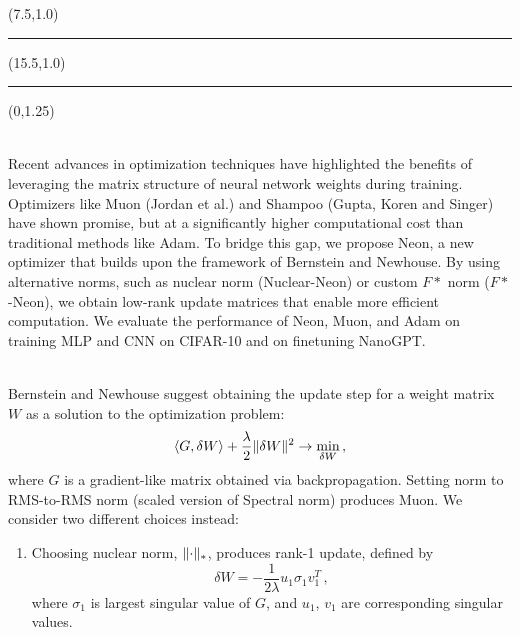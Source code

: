 \documentclass[a0]{a0poster}
\def\Head#1{\noindent{\LARGE\color{black} #1}\bigskip}
\begin{document}
\begin{textblock}{0.02}(7.5,1.0)
\textcolor{lightgray}{\rule{0.02\TPHorizModule}{10\TPVertModule}}
\end{textblock}

\begin{textblock}{0.02}(15.5,1.0)
\textcolor{lightgray}{\rule{0.02\TPHorizModule}{10\TPVertModule}}
\end{textblock}

\begin{textblock}{7.0}(0,1.25)

\Head{Introduction}\\
Recent advances in optimization techniques have highlighted the benefits of leveraging the matrix structure of neural network weights during training. Optimizers like Muon (Jordan et al.) and Shampoo (Gupta, Koren and Singer) have shown promise, but at a significantly higher computational cost than traditional methods like Adam. To bridge this gap, we propose Neon, a new optimizer that builds upon the framework of Bernstein and Newhouse. By using alternative norms, such as nuclear norm (Nuclear-Neon) or custom $F*$ norm ($F*$-Neon), we obtain low-rank update matrices that enable more efficient computation. We evaluate the performance of Neon, Muon, and Adam on training MLP and CNN on CIFAR-10 and on finetuning NanoGPT.

\medskip
\Head{Neon's update rule}\\
Bernstein and Newhouse suggest obtaining the update step for a weight matrix $W$ as a solution to the optimization problem:
\begin{equation}
    \langle G, \delta W \rangle + \frac{\lambda}{2} \Vert{\delta W}\Vert^2 \to \min_{\delta W}\,,
\end{equation}
where $G$ is a gradient-like matrix obtained via backpropagation. Setting norm to RMS-to-RMS norm (scaled version of Spectral norm) produces Muon. We consider two different choices instead:
\begin{enumerate}
    \item Choosing nuclear norm, $\Vert{\cdot}\Vert_*$, produces rank-1 update, defined by 
    \begin{equation}\label{eqn:update_star}
        \delta W = -\frac{1}{2\lambda} u_1 \sigma_1 v_1^T\,,
    \end{equation}
    where $\sigma_1$ is largest singular value of $G$, and $u_1$, $v_1$ are corresponding singular values.


\end{enumerate}
\end{textblock}
\end{document}
